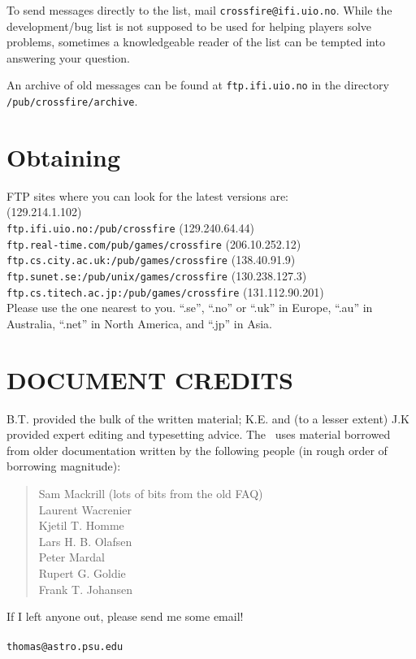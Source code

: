 To send messages directly to the list, mail {\tt crossfire@ifi.uio.no}.
While the development/bug list is not supposed to be used for helping
players solve problems, sometimes a knowledgeable reader of the 
list can be tempted into answering your question.

An archive of old messages can be found at {\tt ftp.ifi.uio.no} in the
directory {\tt /pub/crossfire/archive}. 

\section{Obtaining \cf } \label{sec:obtain}
 
FTP sites where you can look for the latest versions are: \\
 
 (129.214.1.102) \\
{\tt ftp.ifi.uio.no:/pub/crossfire} (129.240.64.44) \\
{\tt ftp.real-time.com/pub/games/crossfire} (206.10.252.12) \\
{\tt ftp.cs.city.ac.uk:/pub/games/crossfire} (138.40.91.9)\\
{\tt ftp.sunet.se:/pub/unix/games/crossfire} (130.238.127.3) \\
{\tt ftp.cs.titech.ac.jp:/pub/games/crossfire} (131.112.90.201) \\
 
Please use the one nearest to you.  ``.se'', ``.no'' or ``.uk'' in Europe,
``.au'' in Australia, ``.net'' in North America, and ``.jp'' in Asia.

\section{DOCUMENT CREDITS}

B.T. provided the bulk of the written material; K.E. and 
(to a lesser extent) J.K provided expert editing and typesetting advice. 
The \playbook\ uses material borrowed from older documentation written 
by the following people (in rough order of borrowing magnitude): 
\begin{quote}
Sam Mackrill (lots of bits from the old FAQ) \\
Laurent Wacrenier \\
Kjetil T. Homme \\
Lars H. B. Olafsen \\
Peter Mardal \\
Rupert G. Goldie \\
Frank T. Johansen
\end{quote}
If I left anyone out, please send me some email! \\ 

 \\ {\tt thomas@astro.psu.edu} \\
